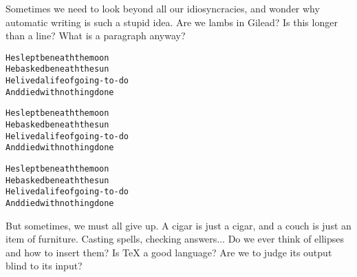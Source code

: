 \documentclass[draft]{article}
\begin{document}
Sometimes we need to look beyond all our idiosyncracies, and wonder why automatic writing is such a stupid idea. Are we lambs in Gilead? Is this longer than a line? What is a paragraph anyway?
\begin{alltt}\normalfont
He slept beneath the moon
  He basked beneath the sun
He lived a life of going-to-do
  And died with nothing done

He slept beneath the moon
  He basked beneath the sun
He lived a life of going-to-do
  And died with nothing done

He slept beneath the moon
  He basked beneath the sun
He lived a life of going-to-do
  And died with nothing done
\end{alltt}
But sometimes, we must all give up. A cigar is just a cigar, and a couch is just an item of furniture. Casting spells, checking answers... Do we ever think of ellipses and how to insert them? Is TeX a good language? Are we to judge its output blind to its input?
\end{document}
